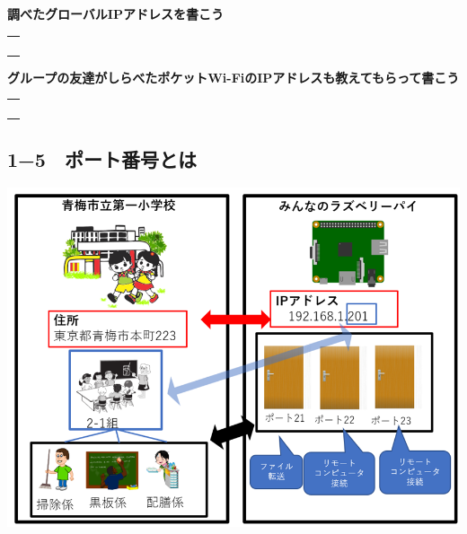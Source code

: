 \documentclass[a4paper,12pt,dvipdfmx]{jarticle}
\begin{document}
\bigskip


\bigskip

{\bfseries
	調べたグローバルIPアドレスを書こう}


\bigskip


\centering
\begin{tabular}{|p{}|} \hline
	\\
	\\
	\\
	\\ \hline
\end{tabular}


\flushleft




\bigskip


\bigskip

{\bfseries
	グループの友達がしらべたポケットWi-FiのIPアドレスも教えてもらって書こう}



\bigskip


\centering
\begin{tabular}{|p{}|} \hline
	\\
	\\
	\\
	\\ \hline
\end{tabular}


\flushleft



\bigskip


\bigskip

\clearpage\subsection*{1−5　ポート番号とは}


\centering
\includegraphics[width=15.004cm]{ome7-img020.png}
\flushleft
\end{document}
